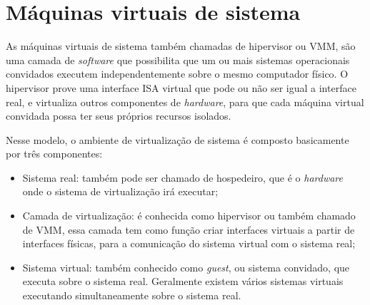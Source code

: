 
\section{Máquinas virtuais de sistema}
\label{section:virtsistema}

As máquinas virtuais de sistema também chamadas de hipervisor ou \ac{VMM}, são uma camada de \textit{software} que possibilita
que um ou mais sistemas operacionais convidados executem independentemente sobre o mesmo computador físico. O hipervisor prove uma interface
\ac{ISA} virtual que pode ou não ser igual a interface real, e virtualiza outros componentes de \textit{hardware}, para que cada máquina
virtual convidada possa ter seus próprios recursos isolados.

Nesse modelo, o ambiente de virtualização de sistema é composto basicamente por três componentes:
\begin{itemize}
 \item Sistema real: também pode ser chamado de hospedeiro, que é o \textit{hardware} onde o sistema de virtualização irá executar;
 \item Camada de virtualização: é conhecida como hipervisor ou também chamado de \ac{VMM}, essa camada tem como função criar interfaces 
 virtuais a partir de interfaces físicas, para a comunicação do sistema virtual com o sistema real;
 \item Sistema virtual: também conhecido como \textit{guest}, ou sistema convidado, que executa sobre o sistema real. Geralmente
 existem vários sistemas virtuais executando simultaneamente sobre o sistema real.
\end{itemize}

